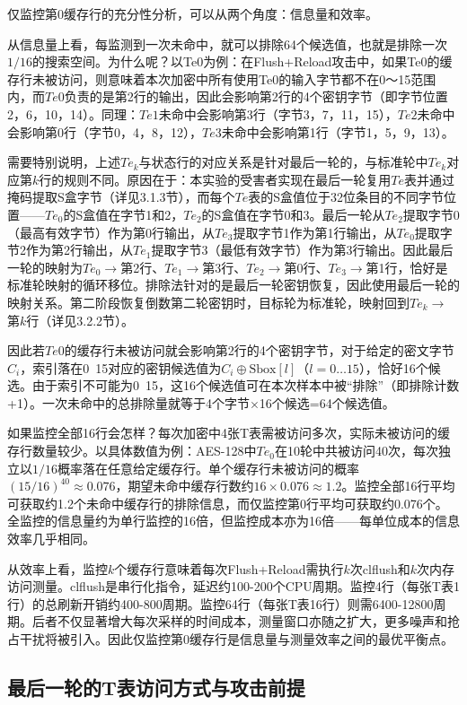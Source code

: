 仅监控第0缓存行的充分性分析，可以从两个角度：信息量和效率。

从信息量上看，每监测到一次未命中，就可以排除64个候选值，也就是排除一次$1/16$的搜索空间。为什么呢？以Te0为例：在Flush+Reload攻击中，如果Te0的缓存行未被访问，则意味着本次加密中所有使用Te0的输入字节都不在0～15范围内，而$Te0$负责的是第2行的输出，因此会影响第2行的4个密钥字节（即字节位置2，6，10，14）。同理：$Te1$未命中会影响第3行（字节3，7，11，15），$Te2$未命中会影响第0行（字节0，4，8，12），$Te3$未命中会影响第1行（字节1，5，9，13）。

需要特别说明，上述$Te_k$与状态行的对应关系是针对最后一轮的，与标准轮中$Te_k$对应第$k$行的规则不同。原因在于：本实验的受害者实现在最后一轮复用$Te$表并通过掩码提取S盒字节（详见3.1.3节），而每个$Te$表的S盒值位于32位条目的不同字节位置——$Te_0$的S盒值在字节1和2，$Te_2$的S盒值在字节0和3。最后一轮从$Te_2$提取字节0（最高有效字节）作为第0行输出，从$Te_3$提取字节1作为第1行输出，从$Te_0$提取字节2作为第2行输出，从$Te_1$提取字节3（最低有效字节）作为第3行输出。因此最后一轮的映射为$Te_0 \to$第2行、$Te_1 \to$第3行、$Te_2 \to$第0行、$Te_3 \to$第1行，恰好是标准轮映射的循环移位。排除法针对的是最后一轮密钥恢复，因此使用最后一轮的映射关系。第二阶段恢复倒数第二轮密钥时，目标轮为标准轮，映射回到$Te_k \to$第$k$行（详见3.2.2节）。

因此若$Te0$的缓存行未被访问就会影响第2行的4个密钥字节，对于给定的密文字节$C_i$，索引落在0~15对应的密钥候选值为$C_i \oplus \text{Sbox}[l]$（$l=0\dots15$），恰好16个候选。由于索引不可能为0~15，这16个候选值可在本次样本中被“排除”（即排除计数+1）。一次未命中的总排除量就等于4个字节$\times$16个候选=64个候选值。

如果监控全部16行会怎样？每次加密中4张T表需被访问多次，实际未被访问的缓存行数量较少。以具体数值为例：AES-128中$Te_0$在10轮中共被访问40次，每次独立以$1/16$概率落在任意给定缓存行。单个缓存行未被访问的概率$(15/16)^{40} \approx 0.076$，期望未命中缓存行数约$16 \times 0.076 \approx 1.2$。监控全部16行平均可获取约1.2个未命中缓存行的排除信息，而仅监控第0行平均可获取约0.076个。全监控的信息量约为单行监控的16倍，但监控成本亦为16倍——每单位成本的信息效率几乎相同。

从效率上看，监控$k$个缓存行意味着每次Flush+Reload需执行$k$次clflush和$k$次内存访问测量。clflush是串行化指令，延迟约100-200个CPU周期。监控4行（每张T表1行）的总刷新开销约400-800周期。监控64行（每张T表16行）则需6400-12800周期。后者不仅显著增大每次采样的时间成本，测量窗口亦随之扩大，更多噪声和抢占干扰将被引入。因此仅监控第0缓存行是信息量与测量效率之间的最优平衡点。

\subsection{最后一轮的T表访问方式与攻击前提}

